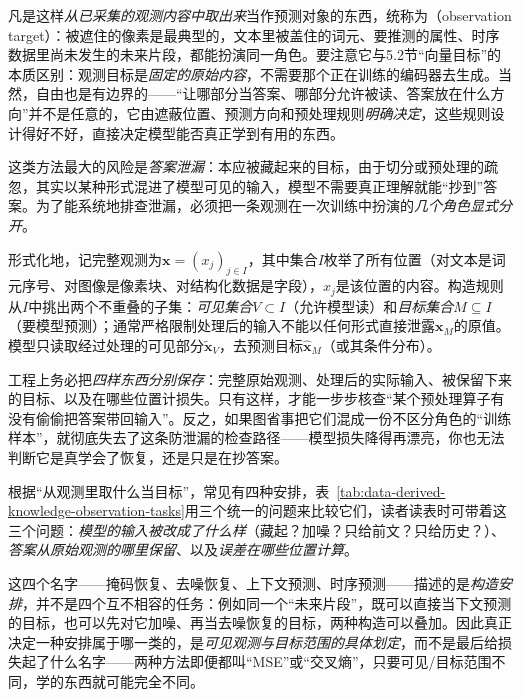 凡是这样\emph{从已采集的观测内容中取出来}当作预测对象的东西，统称为（observation target）：被遮住的像素是最典型的，文本里被盖住的词元、要推测的属性、时序数据里尚未发生的未来片段，都能扮演同一角色。要注意它与5.2节“向量目标”的本质区别：观测目标是\emph{固定的原始内容}，不需要那个正在训练的编码器去生成。当然，自由也是有边界的——“让哪部分当答案、哪部分允许被读、答案放在什么方向”并不是任意的，它由遮蔽位置、预测方向和预处理规则\emph{明确决定}，这些规则设计得好不好，直接决定模型能否真正学到有用的东西。

这类方法最大的风险是\emph{答案泄漏}：本应被藏起来的目标，由于切分或预处理的疏忽，其实以某种形式混进了模型可见的输入，模型不需要真正理解就能“抄到”答案。为了能系统地排查泄漏，必须把一条观测在一次训练中扮演的\emph{几个角色显式分开}。

形式化地，记完整观测为$\bm{x}=(x_j)_{j\in I}$，其中集合$I$枚举了所有位置（对文本是词元序号、对图像是像素块、对结构化数据是字段），$x_j$是该位置的内容。构造规则从$I$中挑出两个不重叠的子集：\emph{可见集合}$V\subset I$（允许模型读）和\emph{目标集合}$M\subseteq I$（要模型预测）；通常严格限制处理后的输入不能以任何形式直接泄露$\bm{x}_M$的原值。模型只读取经过处理的可见部分$\widetilde{\bm{x}}_V$，去预测目标$\widehat{\bm{x}}_M$（或其条件分布）。

工程上务必把\emph{四样东西分别保存}：完整原始观测、处理后的实际输入、被保留下来的目标、以及在哪些位置计损失。只有这样，才能一步步核查“某个预处理算子有没有偷偷把答案带回输入”。反之，如果图省事把它们混成一份不区分角色的“训练样本”，就彻底失去了这条防泄漏的检查路径——模型损失降得再漂亮，你也无法判断它是真学会了恢复，还是只是在抄答案。

根据“从观测里取什么当目标”，常见有四种安排，表~\ref{tab:data-derived-knowledge-observation-tasks}用三个统一的问题来比较它们，读者读表时可带着这三个问题：\emph{模型的输入被改成了什么样}（藏起？加噪？只给前文？只给历史？）、\emph{答案从原始观测的哪里保留}、以及\emph{误差在哪些位置计算}。

这四个名字——掩码恢复、去噪恢复、上下文预测、时序预测——描述的是\emph{构造安排}，并不是四个互不相容的任务：例如同一个“未来片段”，既可以直接当下文预测的目标，也可以先对它加噪、再当去噪恢复的目标，两种构造可以叠加。因此真正决定一种安排属于哪一类的，是\emph{可见观测与目标范围的具体划定}，而不是最后给损失起了什么名字——两种方法即便都叫“MSE”或“交叉熵”，只要可见/目标范围不同，学的东西就可能完全不同。

